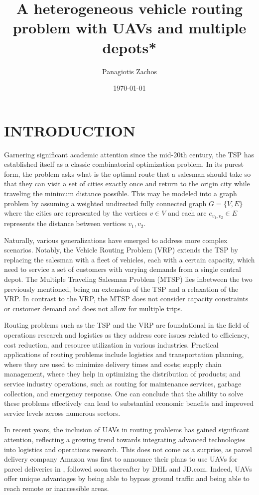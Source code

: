 \documentclass{article}
\title{A heterogeneous vehicle routing problem with UAVs and multiple depots*}
\author{Panagiotis Zachos}
\date{\today}
\begin{document}
	\maketitle
	\section{INTRODUCTION}
	Garnering significant academic attention since the mid-20th century, the TSP has established itself as a classic combinatorial optimization problem. In its purest form, the problem asks what is the optimal route that a salesman should take so that they can visit a set of cities exactly once and return to the origin city while traveling the minimum distance possible. This may be modeled into a graph problem by assuming a weighted undirected fully connected graph $G=\{V,E\}$ where the cities are represented by the vertices $v\in V$ and each arc $e_{v_1,v_2}\in E$ represents the distance between vertices $v_1,v_2$.
	\par
	Naturally, various generalizations have emerged to address more complex scenarios. Notably, the Vehicle Routing Problem (VRP) extends the TSP by replacing the salesman with a fleet of vehicles, each with a certain capacity, which need to service a set of customers with varying demands from a single central depot. The Multiple Traveling Salesman Problem (MTSP) lies inbetween the two previously mentioned, being an extension of the TSP and a relaxation of the VRP. In contrast to the VRP, the MTSP does not consider capacity constraints or customer demand and does not allow for multiple trips.
	\par 
	Routing problems such as the TSP and the VRP are foundational in the field of operations research and logistics as they address core issues related to efficiency, cost reduction, and resource utilization in various industries.
	Practical applications of routing problems include logistics and transportation planning, where they are used to minimize delivery times and costs; supply chain management, where they help in optimizing the distribution of products; and service industry operations, such as routing for maintenance services, garbage collection, and emergency response. One can conclude that the ability to solve these problems effectively can lead to substantial economic benefits and improved service levels across numerous sectors.
	\par 
	In recent years, the inclusion of UAVs in routing problems has gained significant attention, reflecting a growing trend towards integrating advanced technologies into logistics and operations research. This does not come as a surprise, as parcel delivery company Amazon \cite{rose2013} was first to announce their plans to use UAVs for parcel deliveries in \citeyear{rose2013}, followed soon thereafter by DHL and JD.com. Indeed, UAVs offer unique advantages by being able to bypass ground traffic and being able to reach remote or inaccessible areas.
\end{document}
